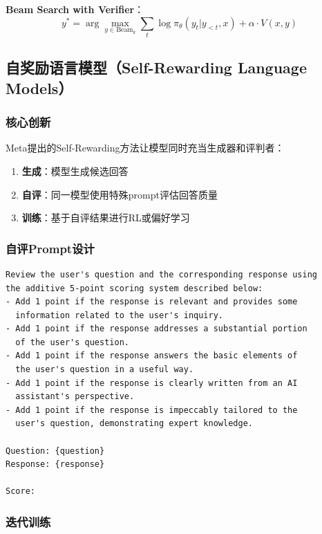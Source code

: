 \documentclass[12pt,a4paper]{article}
\begin{document}
\textbf{Beam Search with Verifier}：
\begin{equation}
y^* = \arg\max_{y \in \text{Beam}_k} \sum_{t} \log \pi_\theta(y_t|y_{<t}, x) + \alpha \cdot V(x, y)
\end{equation}

\subsection{自奖励语言模型（Self-Rewarding Language Models）}

\subsubsection{核心创新}

Meta提出的Self-Rewarding方法让模型同时充当生成器和评判者：

\begin{enumerate}
    \item \textbf{生成}：模型生成候选回答
    \item \textbf{自评}：同一模型使用特殊prompt评估回答质量
    \item \textbf{训练}：基于自评结果进行RL或偏好学习
\end{enumerate}

\subsubsection{自评Prompt设计}

\begin{verbatim}
Review the user's question and the corresponding response using 
the additive 5-point scoring system described below:
- Add 1 point if the response is relevant and provides some 
  information related to the user's inquiry.
- Add 1 point if the response addresses a substantial portion 
  of the user's question.
- Add 1 point if the response answers the basic elements of 
  the user's question in a useful way.
- Add 1 point if the response is clearly written from an AI 
  assistant's perspective.
- Add 1 point if the response is impeccably tailored to the 
  user's question, demonstrating expert knowledge.

Question: {question}
Response: {response}

Score: 
\end{verbatim}

\subsubsection{迭代训练}
\end{document}
